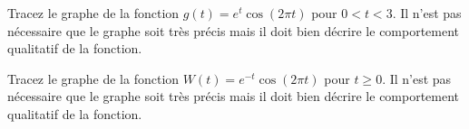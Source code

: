 \begin{question}[\eng \life]
Tracez le graphe de la fonction $g(t) = e^t \cos(2\pi t)$ pour $0<t<3$.
Il n'est pas nécessaire que le graphe soit très précis mais il doit
bien décrire le comportement qualitatif de la fonction.
\label{2Q32}
\end{question}

\begin{question}[\eng \life]
Tracez le graphe de la fonction $W(t) = e^{-t}\cos(2\pi t)$ pour $t\geq 0$.
Il n'est pas nécessaire que le graphe soit très précis mais il doit
bien décrire le comportement qualitatif de la fonction.
\label{2Q33}
\end{question}


